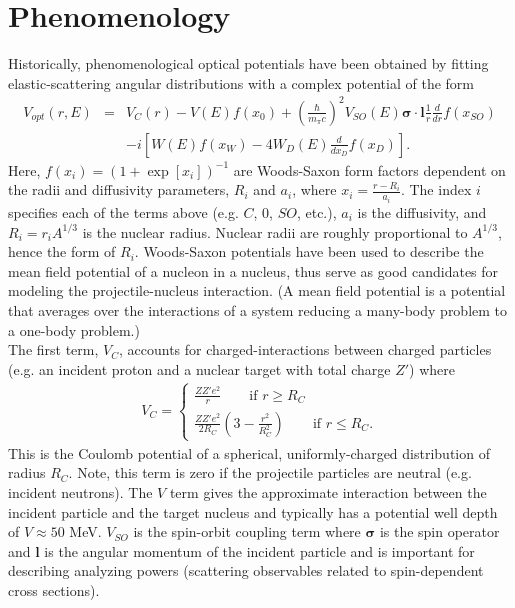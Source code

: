 \documentclass[preprintnumbers,floatfix,aps,prc,preprint,nofootinbib]{revtex4-1}
\begin{document}
\section{Phenomenology}
\label{sec:phenomenology}


Historically, phenomenological optical potentials have been obtained by fitting elastic-scattering angular distributions with a complex potential of the form \cite{Perey:1976zz, Dickhoff:2018wdd}
%
\begin{eqnarray}
	\label{eq:phenomenological_optical_potential}
	V_{opt}(r, E) &=& V_C(r) - V(E) f(x_0) + (\frac{\hbar}{m_{\pi} c})^2 V_{SO}(E) \bm{\sigma} \cdot \textbf{l} \frac{1}{r} \frac{d}{dr} f(x_{SO}) \nonumber \\ 
& &- i [W(E) f(x_W) - 4 W_D(E) \frac{d}{dx_D} f(x_D)].
\end{eqnarray}
%
Here, $f(x_i) = (1 + \exp[x_i])^{-1}$ are Woods-Saxon form factors dependent on the radii and diffusivity parameters, $R_i$ and $a_i$, where $x_i = \frac{r-R_i}{a_i}$. The index $i$ specifies each of the terms above (e.g. $C$, $0$, $SO$, etc.), $a_i$ is the diffusivity, and $R_i = r_i A^{1/3}$ is the nuclear radius. Nuclear radii are roughly proportional to $A^{1/3}$, hence the form of $R_i$. Woods-Saxon potentials have been used to describe the mean field potential of a nucleon in a nucleus, thus serve as good candidates for modeling the projectile-nucleus interaction. (A mean field potential is a potential that averages over the interactions of a system reducing a many-body problem to a one-body problem.)
\\

The first term, $V_C$, accounts for charged-interactions between charged particles (e.g. an incident proton and a nuclear target with total charge $Z'$) where
%
\begin{eqnarray}
	\label{eq:coulomb_potential}
	V_C =
	\begin{cases}
		\frac{Z Z' e^2}{r} \qquad \text{if $r \geq R_C$} \\
		\frac{Z Z' e^2}{2 R_C} (3 - \frac{r^2}{R_C^2}) \qquad \text{if $r \leq R_C$}.
	\end{cases}
\end{eqnarray}
%
This is the Coulomb potential of a spherical, uniformly-charged distribution of radius $R_C$. Note, this term is zero if the projectile particles are neutral (e.g. incident neutrons). The $V$ term gives the approximate interaction between the incident particle and the target nucleus and typically has a potential well depth of $V \approx 50$ MeV. $V_{SO}$ is the spin-orbit coupling term where $\bm{\sigma}$ is the spin operator and $\bm{l}$ is the angular momentum of the incident particle and is important for describing analyzing powers (scattering observables related to spin-dependent cross sections).
\\
\end{document}
